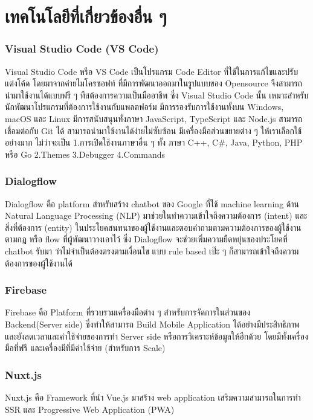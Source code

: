 \section{เทคโนโลยีที่เกี่ยวข้องอื่น ๆ}

\subsubsection{Visual Studio Code (VS Code)}
\quad Visual Studio Code หรือ VS Code เป็นโปรแกรม Code Editor ที่ใช้ในการแก้ไขและปรับแต่งโค้ด โดยมาจากค่ายไมโครซอฟท์ ที่มีการพัฒนาออกมาในรูปแบบของ Opensource จึงสามารถนำมาใช้งานได้แบบฟรี ๆ ทีสต้องการความเป็นมืออาชีพ ซึ่ง Visual Studio Code นั้น เหมาะสำหรับนักพัฒนาโปรแกรมที่ต้องการใช้งานกับแพลตฟอร์ม มีการรองรับการใช้งานทั้งบน Windows, macOS และ Linux มีการสนับสนุนทั้งภาษา  JavaScript, TypeScript และ Node.js สามารถเชื่อมต่อกับ  Git ได้ สามารถนำมาใช้งานได้ง่ายไม่ซับซ้อน มีเครื่องมือส่วนขยายต่าง ๆ ให้เราเลือกใช้อย่างมาก ไม่ว่าจะเป็น 1.การเปิดใช้งานภาษาอื่น ๆ ทั้ง ภาษา  C++,  C\#, Java, Python, PHP หรือ Go  2.Themes 3.Debugger 4.Commands 

\subsubsection{Dialogflow} 
\quad Dialogflow คือ platform สำหรับสร้าง chatbot ของ Google ที่ใช้ machine learning ด้าน Natural Language Processing (NLP) มาช่วยในทำความเข้าใจถึงความต้องการ (intent) และสิ่งที่ต้องการ (entity) ในประโยคสนทนาของผู้ใช้งานและตอบคำถามตามความต้องการของผู้ใช้งาน ตามกฎ หรือ flow ที่ผู้พัฒนาวางเอาไว้ ซึ่ง Dialogflow จะช่วยเพิ่มความยืดหยุ่นของประโยคที่ chatbot รับมา ว่าไม่จำเป็นต้องตรงตามเงื่อนไข แบบ rule based เป๊ะ ๆ ก็สามารถเข้าใจถึงความต้องการของผู้ใช้งานได้ 

\subsubsection{Firebase} 
\quad Firebase คือ Platform ที่รวบรวมเครื่องมือต่าง ๆ สำหรับการจัดการในส่วนของ Backend(Server side) ซึ่งทำให้สามารถ Build Mobile Application ได้อย่างมีประสิทธิภาพ และยังลดเวลาและค่าใช้จ่ายของการทำ Server side หรือการวิเคราะห์ข้อมูลให้อีกด้วย โดยมีทั้งเครื่องมือที่ฟรี และเครื่องมีที่มีค่าใช้จ่าย (สำหรับการ Scale) 

\subsubsection{Nuxt.js }
\quad Nuxt.js คือ Framework ที่นำ Vue.js มาสร้าง web application เสริมความสามารถในการทำ SSR และ Progressive Web Application (PWA) 


